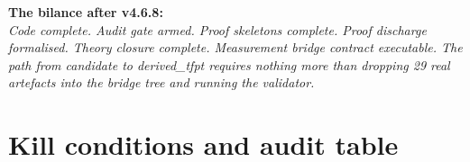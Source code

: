 \documentclass[11pt,a4paper]{article}
\begin{document}
\begin{tfptfrontbox}
\textbf{The bilance after v4.6.8:}\\
\emph{Code complete. Audit gate armed. Proof skeletons complete.
Proof discharge formalised. Theory closure complete. Measurement
bridge contract executable. The path from candidate to
derived\_tfpt requires nothing more than dropping 29 real artefacts
into the bridge tree and running the validator.}
\end{tfptfrontbox}

\section{Kill conditions and audit table}
\label{sec:kills}
\end{document}
